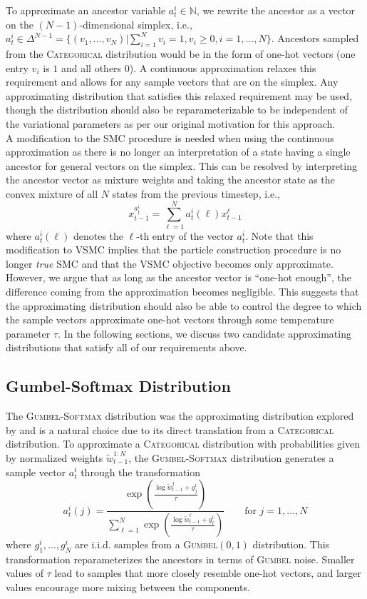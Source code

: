 \documentclass[12pt]{article}
\newcommand{\vsmc}{\textsc{VSMC}\xspace}
\newcommand{\smc}{\textsc{SMC}\xspace}
\newcommand{\categorical}{\textsc{Categorical}\xspace}
\newcommand{\gumbelsoftmax}{\textsc{Gumbel-Softmax}\xspace}
\newcommand{\gumbel}{\textsc{Gumbel}\xspace}
\begin{document}
To approximate an ancestor variable $a_t^i\in\mathbb{N}$, we rewrite the ancestor as a vector on the $(N-1)$-dimensional simplex, i.e., $a_t^i \in \Delta^{N-1}=\{(v_1,...,v_N)|\sum_{i=1}^Nv_i=1,v_i\geq0, i=1,...,N\}$. Ancestors sampled from the \categorical distribution would be in the form of one-hot vectors (one entry $v_i$ is $1$ and all others $0$). A continuous approximation relaxes this requirement and allows for any sample vectors that are on the simplex. Any approximating distribution that satisfies this relaxed requirement may be used, though the distribution should also be reparameterizable to be independent of the variational parameters as per our original motivation for this approach.
\\

A modification to the \smc procedure is needed when using the continuous approximation as there is no longer an interpretation of a state having a single ancestor for general vectors on the simplex. This can be resolved by interpreting the ancestor vector as mixture weights and taking the ancestor state as the convex mixture of all $N$ states from the previous timestep, i.e.,
\[
x_{t-1}^{a_t^i} = \sum_{\ell=1}^Na_t^i(\ell)x_{t-1}^{\ell}
\]
where $a_t^i(\ell)$ denotes the $\ell$-th entry of the vector $a_t^i$. Note that this modification to \vsmc implies that the particle construction procedure is no longer \textit{true} \smc and that the \vsmc objective becomes only approximate. However, we argue that as long as the ancestor vector is ``one-hot enough'', the difference coming from the approximation becomes negligible. This suggests that the approximating distribution should also be able to control the degree to which the sample vectors approximate one-hot vectors through some temperature parameter $\tau$. In the following sections, we discuss two candidate approximating distributions that satisfy all of our requirements above.

\subsection{Gumbel-Softmax Distribution}

The \gumbelsoftmax distribution \parencite{Jang:2017,Maddison:2017} was the approximating distribution explored by \textcite{Lawson:2018} and is a natural choice due to its direct translation from a \categorical distribution. To approximate a \categorical distribution with probabilities given by normalized weights $\tilde{w}_{t-1}^{1:N}$, the \gumbelsoftmax distribution generates a sample vector $a_t^i$ through the transformation
\[
a_t^i(j) = \frac{\exp\left(\frac{\log \tilde{w}_{t-1}^j+g_j^i}{\tau}\right)}{\sum_{\ell=1}^N\exp\left(\frac{\log \tilde{w}_{t-1}^\ell+g_\ell^i}{\tau}\right)} \qquad \text{for } j=1,...,N
\]
where $g_1^i,...,g_N^i$ are i.i.d. samples from a \textsc{Gumbel}$(0,1)$ distribution. This transformation reparameterizes the ancestors in terms of \gumbel noise. Smaller values of $\tau$ lead to samples that more closely resemble one-hot vectors, and larger values encourage more mixing between the components.
\end{document}
